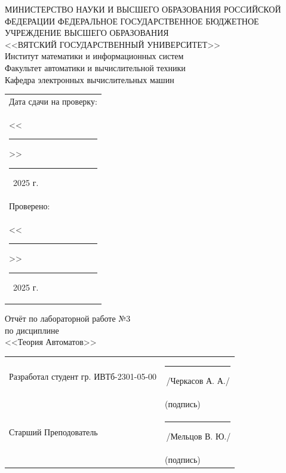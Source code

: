 \documentclass[oneside,a4paper,14pt]{extarticle}
\begin{document}
\newpage
\thispagestyle{empty}
\begin{center}
  МИНИСТЕРСТВО НАУКИ И ВЫСШЕГО ОБРАЗОВАНИЯ РОССИЙСКОЙ ФЕДЕРАЦИИ ФЕДЕРАЛЬНОЕ ГОСУДАРСТВЕННОЕ БЮДЖЕТНОЕ УЧРЕЖДЕНИЕ ВЫСШЕГО ОБРАЗОВАНИЯ\\
  <<ВЯТСКИЙ ГОСУДАРСТВЕННЫЙ УНИВЕРСИТЕТ>>\\
  Институт математики и информационных систем\\
  Факультет автоматики и вычислительной техники\\
  Кафедра электронных вычислительных машин
\end{center}
\vspace{10mm}

\hfill
\begin{tabular}{l}
  \footnotesize Дата сдачи на проверку:                                          \\
  \footnotesize <<\rule[-1mm]{5mm}{0.10mm}\/>>\rule[-1mm]{20mm}{0.10mm}\ 2025 г. \\
  \footnotesize Проверено:                                                       \\
  \footnotesize <<\rule[-1mm]{5mm}{0.10mm}\/>>\rule[-1mm]{20mm}{0.10mm}\ 2025 г. \\
\end{tabular}
\vfill

\begin{center}
  Отчёт по лабораторной работе №3\\
  по дисциплине\\
  <<Теория Автоматов>>\\
\end{center}
\vspace{25mm}
\noindent
\begin{tabular}{ll}
  Разработал студент гр. ИВТб-2301-05-00 & \hspace{18mm}\rule[-1mm]{30mm}{0.10mm}\,/Черкасов А. А./ \\
                                         & \hspace{25.5mm}\footnotesize(подпись)                    \\
  Старший Преподователь                  & \hspace{18mm}\rule[-1mm]{30mm}{0.10mm}\,/Мельцов В. Ю./  \\
                                         & \hspace{25.5mm}\footnotesize(подпись)                    \\
\end{tabular}
\end{document}
